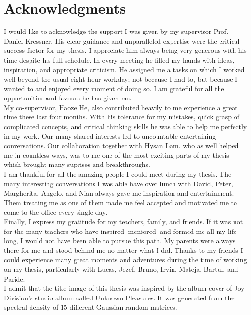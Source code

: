 \chapter*{Acknowledgments}
\label{chp:0-acknowledgments}

I would like to acknowledge the support I was given by my supervisor
Prof. Daniel Kressner. His clear guidance and unparalleled expertise were the
critical success factor for my thesis. I appreciate him always being very generous
with his time despite his full schedule. In every meeting he filled my hands with
ideas, inspiration, and appropriate criticism. He assigned me a tasks on which
I worked well beyond the usual eight hour workday; not because I had to, but because
I wanted to and enjoyed every moment of doing so. I am grateful for all the
opportunities and favours he has given me.\\ %

My co-supervisor, Haoze He, also contributed heavily to me experience a great time
these last four months. With his tolerance for my mistakes, quick grasp of
complicated concepts, and critical thinking skills he was able to help me
perfectly in my work. Our many shared interests led to uncountable
entertaining conversations. Our collaboration together with Hysan Lam, who
as well helped me in countless ways, was to me one of the most exciting parts of
my thesis which brought many suprises and breakthroughs.\\

I am thankful for all the amazing people I could meet during my thesis.
The many interesting conversations I was able have over lunch with David, Peter,
Margherita, Angelo, and Nian always gave me inspiration and entertainment.
Them treating me as one of them made me feel accepted and motivated me to come
to the office every single day.\\

Finally, I express my gratitude for my teachers, family, and friends.
If it was not for the many teachers who have inspired, mentored, and formed me
all my life long, I would not have been able to pursue this path.
My parents were always there for me and stood behind me no matter what I did.
Thanks to my friends I could experience many great moments and adventures
during the time of working on my thesis, particularly with Lucas, Jozef, Bruno,
Irvin, Mateja, Bartul, and Paride.\\ 

I admit that the title image of this thesis was inspired
by the album cover of Joy Division's studio album called Unknown Pleasures.
It was generated from the spectral density of 15 different Gaussian random matrices.
